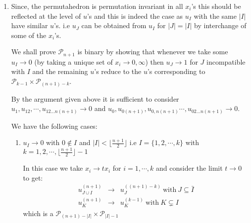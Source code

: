 \documentclass[hidelinks,12pt]{article}
\newcommand{\bea}[1]{\begin{eqnarray}\label{#1} }
\newcommand{\eea}{\end{eqnarray}}
\def\bea{\begin{eqnarray}}
\def\eea{\end{eqnarray}}
\begin{document}
\begin{enumerate}
\begin{enumerate}


{\bf compatible if and only if} $\{[0,n],I,J\}$ is a nested set, i.e.
\[
I\subset J\quad \text{or}\quad J\subset I\quad \text{or}\quad (J\cap I=\varnothing \quad \text{and}\quad J\cup I\not\in \mathscr P_n).
\]
For permutohedron, $J\cup I$ is always contained in $\mathscr P_n$ for any $I$ and $J$, so it's compatible if and only if $J\subset I$ or $I\subset J$.

The above  follows directly from the following relations amongst $u$ for each $I$ such that $0\notin I$ :
\bea
1-\prod_{I \subset J} u_{J} &=& \prod_{{J}\atop{J\cap \bar{I} \ne \emptyset}} u_{\bar{J}} \\
1-\prod_{J \subset I} u_{\bar{J}} &=& \prod_{I \subset J} u_{J} \prod_{J \subset \bar{I} } u_{\bar{J}}
\eea


\item  Since, the permutahedron is permutation invariant in all $x_i$'s this should be reflected at the level of $u$'s and this is indeed the case as $u_I$ with the same $|I|$ have similar $u$'s. i.e $u_J$ can be obtained from $u_I$ for $|J|=|I|$ by interchange of some of the $x_i$'s.

We shall prove $\mathscr P_{n+1}$ is binary by showing that whenever we take some $u_I \rightarrow 0$ (by taking a unique set of $x_i \rightarrow 0, \infty$) then $u_J \rightarrow 1$ for $J$ incompatible with $I$ and the remaining $u$'s reduce to the $u$'s corresponding to $\mathscr P_{k-1} \times \mathscr P_{(n+1)-k}$. 

By the argument given above it is sufficient to consider $u_1, u_{12},\cdots,u_{12...n(n+1)} \rightarrow 0$ and $u_0, u_{0(n+1)},u_{0,n(n+1)}\cdots,u_{02...n(n+1)} \rightarrow 0$.

We have the following cases:
\begin{enumerate}
    \item $u_I \rightarrow 0$ with $0\notin I$ and $|I| < \lfloor \frac{n+1}{2} \rfloor$ i.e $I =  \{1,2,\cdots, k \}$ with $k= 1,2,\cdots, \lfloor \frac{n+1}{2} \rfloor -1$
    
    In this case we take $x_i \rightarrow t x_i$ for $i=1,\cdots, k $ and consider the limit $t \rightarrow 0$ to get:
    \bea
    u^{(n+1)}_{J \cup  I} &\rightarrow& u_{J}^{((n+1)-k )} ~\text{with}~ J\subseteq\bar{I}\\
     u^{(n+1)}_{K} &\rightarrow& u_{K}^{(k-1)} ~\text{with}~ K\subsetneq I
    \eea
   which is a $\mathscr P_{(n+1)-|I|} \times \mathscr P_{|I|-1}$ 
    

\end{enumerate}
\end{enumerate}
\end{enumerate}
\end{document}
